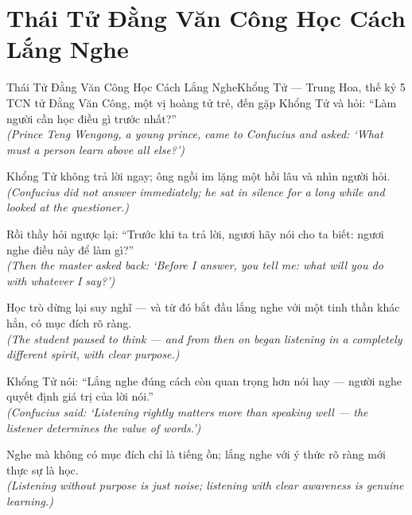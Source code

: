\section{Thái Tử Đằng Văn Công Học Cách Lắng Nghe}
\begin{truyen}{Thái Tử Đằng Văn Công Học Cách Lắng Nghe}{Khổng Tử --- Trung Hoa, thế kỷ 5 TCN}
 tử Đằng Văn Công, một vị hoàng tử trẻ, đến gặp Khổng Tử và hỏi: ``Làm người cần học điều gì trước nhất?''\\[4pt]
\textit{(Prince Teng Wengong, a young prince, came to Confucius and asked: `What must a person learn above all else?')}

Khổng Tử không trả lời ngay; ông ngồi im lặng một hồi lâu và nhìn người hỏi.\\[4pt]
\textit{(Confucius did not answer immediately; he sat in silence for a long while and looked at the questioner.)}

Rồi thầy hỏi ngược lại: ``Trước khi ta trả lời, ngươi hãy nói cho ta biết: ngươi nghe điều này để làm gì?''\\[4pt]
\textit{(Then the master asked back: `Before I answer, you tell me: what will you do with whatever I say?')}

Học trò dừng lại suy nghĩ --- và từ đó bắt đầu lắng nghe với một tinh thần khác hẳn, có mục đích rõ ràng.\\[4pt]
\textit{(The student paused to think --- and from then on began listening in a completely different spirit, with clear purpose.)}

Khổng Tử nói: ``Lắng nghe đúng cách còn quan trọng hơn nói hay --- người nghe quyết định giá trị của lời nói.''\\[4pt]
\textit{(Confucius said: `Listening rightly matters more than speaking well --- the listener determines the value of words.')}

\end{truyen}
\begin{baihoc}
  Nghe mà không có mục đích chỉ là tiếng ồn; lắng nghe với ý thức rõ ràng mới thực sự là học.\\[4pt]
  \textit{(Listening without purpose is just noise; listening with clear awareness is genuine learning.)}
\end{baihoc}
